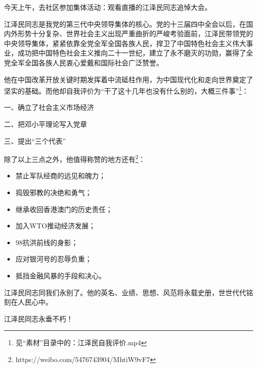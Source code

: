 今天上午，去社区参加集体活动：观看直播的江泽民同志追悼大会。

江泽民同志是我党的第三代中央领导集体的核心。党的十三届四中全会以后，在国内外形势十分复杂、世界社会主义出现严重曲折的严峻考验面前，江泽民带领党的中央领导集体，紧紧依靠全党全军全国各族人民，捍卫了中国特色社会主义伟大事业，成功把中国特色社会主义推向二十一世纪，建立了永不磨灭的功勋，赢得了全党全军全国各族人民衷心爱戴和国际社会广泛赞誉。

他在中国改革开放关键时期发挥着中流砥柱作用，为中国现代化和走向世界奠定了坚实的基础。而他却自我评价为“干了这十几年也没有什么别的，大概三件事”\footnote{见“素材”目录中的：江泽民自我评价.mp4}：

一、确立了社会主义市场经济

二、把邓小平理论写入党章

三、提出“三个代表”

除了以上三点之外，他值得称赞的地方还有\footnote{https://weibo.com/5476743904/MhtiW9vF7}：

\begin{itemize}[nosep, left=\parindent]
    \item 禁止军队经商的远见和魄力；
    \item 捣毁邪教的决绝和勇气；
    \item 继承收回香港澳门的历史责任；
    \item 加入WTO推动经济发展；
    \item 98抗洪前线的身影；
    \item 应对银河号的忍辱负重；
    \item 抵挡金融风暴的手段和决心。
\end{itemize}

江泽民同志同我们永别了。他的英名、业绩、思想、风范将永载史册，世世代代铭刻在人民心中。

\begin{center}
    \Huge 江泽民同志永垂不朽！
\end{center}

